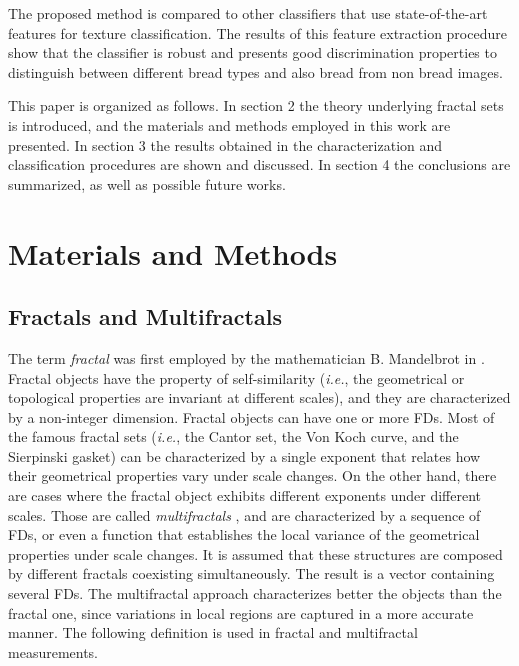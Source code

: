 The proposed method is compared to other classifiers that use state-of-the-art features for texture classification. The results of this feature extraction procedure show that the classifier is robust and presents good discrimination properties to distinguish between different bread types and also bread from non bread images.

This paper is organized as follows. In section 2 the theory underlying fractal sets is introduced, and the materials and methods employed in this work are presented. In section 3 the results obtained in the characterization and classification procedures are shown and discussed. In section 4 the conclusions are summarized, as well as possible future works.


\section{Materials and Methods}
\label{sec:1}
\subsection{Fractals and Multifractals}
\label{sec:2}

The term {\em fractal} was first employed by the mathematician B. Mandelbrot in \cite{Mandelbrot83}. Fractal objects have the property of self-similarity ({\em i.e.}, the geometrical or topological properties are invariant at different scales), and they are characterized by a non-integer dimension. Fractal objects can have one or more FDs. Most of the famous fractal sets ({\em i.e.}, the Cantor set, the Von Koch curve, and the Sierpinski gasket) can be characterized by a single exponent that relates how their geometrical properties vary under scale changes. On the other hand, there are cases where the fractal object exhibits different exponents under different scales. Those are called {\it multifractals} \cite{Mandelbrot89}, and are characterized by a sequence of FDs, or even a function that establishes the local variance of the geometrical properties under scale changes. It is assumed that these structures are composed by different fractals coexisting simultaneously. The result is a vector containing several FDs. The multifractal approach characterizes better the objects than the fractal one, since variations in local regions are captured in a more accurate manner. The following definition is used in fractal and multifractal measurements.


